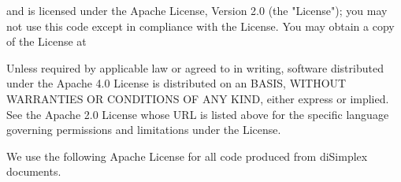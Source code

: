{\blank[small]

\startcenteraligned
{}
\stopcenteraligned

\blank[small]

and is licensed under the Apache License, Version 2.0 (the "License");
you may not use this code except in compliance with the License. You may
obtain a copy of the License at

\blank[small]

\startcenteraligned
{}
\stopcenteraligned

\blank[small]

Unless required by applicable law or agreed to in writing, software
distributed under the Apache 4.0 License is distributed on an  BASIS, WITHOUT WARRANTIES OR CONDITIONS OF ANY KIND, either express
or implied. See the Apache 2.0 License whose URL is listed above for the
specific language governing permissions and limitations under the
License.

\stopmakeup
}
\stopMkIVCode

We use the following Apache License for all code produced from diSimplex 
documents.

\startMkIVCode
\def\placeMkIVCopyright#1{\addApacheLicense{MkIVCode}{}{#1}}

\def\placeLuaCopyright#1{\addApacheLicense{LuaCode}{--}{#1}}

\def\placeCHeaderCopyright#1{\addApacheLicense{CHeader}{//}{#1}}
\def\placeCCodeCopyright#1{\addApacheLicense{CCode}{//}{#1}}
\def\addCTestCopyright#1{\addCTestApacheLicense{default}{#1}}

\def\placeJoylolCodeCopyright#1{\addApacheLicense{JoylolCode}{//}{#1}}
\def\prependJoylolCodeCopyright#1{
  \prependJoylolCode{default}
  \addApacheLicense{JoylolCode}{//}{#1}
}

\def\placeLmsfileCopyright#1{\addApacheLicense{Lmsfile}{--}{#1}}
\def\prependLmsfileCopyright#1{
  \prependLmsfile{default}
  \addApacheLicense{Lmsfile}{--}{#1}
}

\stopMkIVCode

